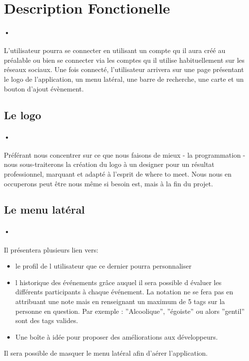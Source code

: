\documentclass[pdftex,12pt,a4paper]{article}
\begin{document}
\section{Description Fonctionelle}
\paragraph{•}
L’utilisateur pourra se connecter en utilisant un compte qu il aura cr\'e\'e au pr\'ealable ou bien se connecter via les comptes qu il utilise habituellement sur les réseaux sociaux.
Une fois connect\'e, l’utilisateur arrivera sur une page pr\'esentant le logo de l’application, un menu lat\'eral, une barre de recherche, une carte et un bouton d’ajout \'ev\`enement.

\subsection{Le logo}
\paragraph{•}
Pr\'ef\'erant nous concentrer sur ce que nous faisons de mieux - la programmation - nous sous-traiterons la cr\'eation du logo à un designer pour un résultat professionnel, marquant et adapt\'e à l’esprit de where to meet. Nous nous en occuperons peut \^etre nous m\^eme si besoin est, mais à la fin du projet. 
\newpage
\subsection{Le menu lat\'eral}
\paragraph{•}
Il pr\'esentera plusieurs lien vers:
\begin{itemize}
 \item le profil de l utilisateur que ce dernier pourra personnaliser
\item l historique des \'ev\'enements gr\^ace auquel il sera possible d \'evaluer les diff\'erents participants \`a chaque \'ev\'enement. La notation ne se fera pas en attribuant une note mais en renseignant un maximum de 5 tags sur la personne en question. Par exemple : ''Alcoolique'', ''\'egoiste'' ou alors ''gentil'' sont des tags valides. 
\item Une bo\^ite \`a id\'ee pour proposer des am\'eliorations aux développeurs.
\end{itemize}
Il sera possible de masquer le menu latéral afin d'aérer l’application. 
\end{document}
